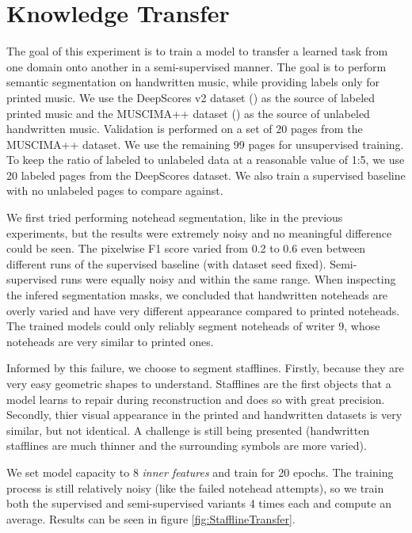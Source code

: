 \section{Knowledge Transfer}
\label{sec:KnowledgeTransfer}

The goal of this experiment is to train a model to transfer a learned task from one domain onto another in a semi-supervised manner. The goal is to perform semantic segmentation on handwritten music, while providing labels only for printed music. We use the DeepScores v2 dataset (\cite{DeepScores}) as the source of labeled printed music and the MUSCIMA++ dataset (\cite{MuscimaPP}) as the source of unlabeled handwritten music. Validation is performed on a set of 20 pages from the MUSCIMA++ dataset. We use the remaining 99 pages for unsupervised training. To keep the ratio of labeled to unlabeled data at a reasonable value of 1:5, we use 20 labeled pages from the DeepScores dataset. We also train a supervised baseline with no unlabeled pages to compare against.

We first tried performing notehead segmentation, like in the previous experiments, but the results were extremely noisy and no meaningful difference could be seen. The pixelwise F1 score varied from 0.2 to 0.6 even between different runs of the supervised baseline (with dataset seed fixed). Semi-supervised runs were equally noisy and within the same range. When inspecting the infered segmentation masks, we concluded that handwritten noteheads are overly varied and have very different appearance compared to printed noteheads. The trained models could only reliably segment noteheads of writer 9, whose noteheads are very similar to printed ones.

Informed by this failure, we choose to segment stafflines. Firstly, because they are very easy geometric shapes to understand. Stafflines are the first objects that a model learns to repair during reconstruction and does so with great precision. Secondly, thier visual appearance in the printed and handwritten datasets is very similar, but not identical. A challenge is still being presented (handwritten stafflines are much thinner and the surrounding symbols are more varied).

We set model capacity to 8 \emph{inner features} and train for 20 epochs. The training process is still relatively noisy (like the failed notehead attempts), so we train both the supervised and semi-supervised variants 4 times each and compute an average. Results can be seen in figure \ref{fig:StafflineTransfer}.

